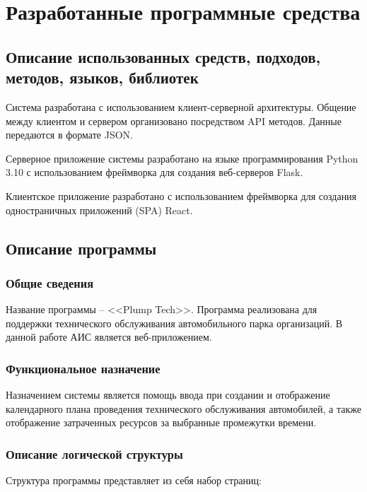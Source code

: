 \documentclass[../nirs.tex]{subfiles}
\begin{document}
    \section{Разработанные программные средства}
    \subsection{Описание использованных средств, подходов, методов, языков,
        библиотек}

    Система разработана с использованием клиент-серверной архитектуры. Общение
    между клиентом и сервером организовано посредством API методов. Данные
    передаются в формате JSON.

    Серверное приложение системы разработано на языке программирования Python
    3.10 с использованием фреймворка для создания веб-серверов Flask.

    Клиентское приложение разработано с использованием фреймворка для создания
    одностраничных приложений (SPA) React.

    \subsection{Описание программы}

    \subsubsection*{Общие сведения}

    Название программы -- <<Plump Tech>>. Программа реализована для поддержки
    технического обслуживания автомобильного парка организаций. В данной работе
    АИС является веб-приложением.

    \subsubsection*{Функциональное назначение}

    Назначением системы является помощь ввода при создании и отображение
    календарного плана проведения технического обслуживания автомобилей, а
    также отображение затраченных ресурсов за выбранные промежутки времени.

    \subsubsection*{Описание логической структуры}

    Структура программы представляет из себя набор страниц:
\end{document}
